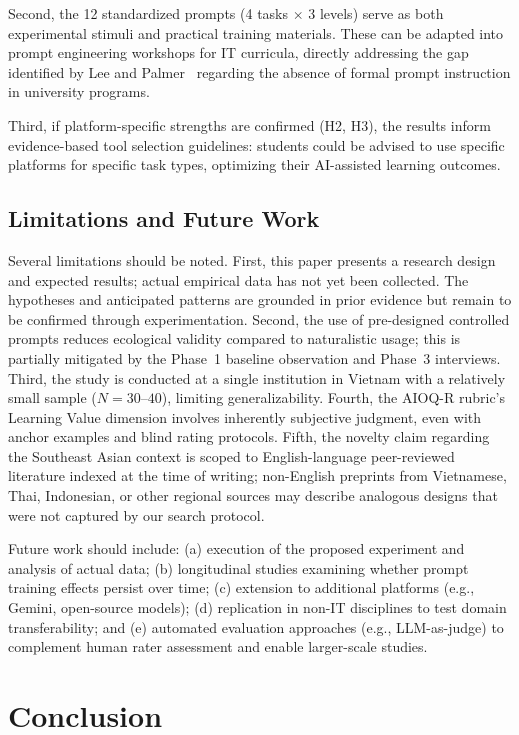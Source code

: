 \documentclass[runningheads]{llncs}
\begin{document}
Second, the 12 standardized prompts (4 tasks $\times$ 3 levels) serve as both experimental stimuli and practical training materials. These can be adapted into prompt engineering workshops for IT curricula, directly addressing the gap identified by Lee and Palmer~\cite{Lee2025} regarding the absence of formal prompt instruction in university programs.

Third, if platform-specific strengths are confirmed (H2, H3), the results inform evidence-based tool selection guidelines: students could be advised to use specific platforms for specific task types, optimizing their AI-assisted learning outcomes.

\subsection{Limitations and Future Work}

Several limitations should be noted. First, this paper presents a research design and expected results; actual empirical data has not yet been collected. The hypotheses and anticipated patterns are grounded in prior evidence but remain to be confirmed through experimentation. Second, the use of pre-designed controlled prompts reduces ecological validity compared to naturalistic usage; this is partially mitigated by the Phase~1 baseline observation and Phase~3 interviews. Third, the study is conducted at a single institution in Vietnam with a relatively small sample ($N = 30$--$40$), limiting generalizability. Fourth, the AIOQ-R rubric's Learning Value dimension involves inherently subjective judgment, even with anchor examples and blind rating protocols. Fifth, the novelty claim regarding the Southeast Asian context is scoped to English-language peer-reviewed literature indexed at the time of writing; non-English preprints from Vietnamese, Thai, Indonesian, or other regional sources may describe analogous designs that were not captured by our search protocol.

Future work should include: (a) execution of the proposed experiment and analysis of actual data; (b) longitudinal studies examining whether prompt training effects persist over time; (c) extension to additional platforms (e.g., Gemini, open-source models); (d) replication in non-IT disciplines to test domain transferability; and (e) automated evaluation approaches (e.g., LLM-as-judge) to complement human rater assessment and enable larger-scale studies.

\section{Conclusion}\label{sec:conclusion}
\end{document}
